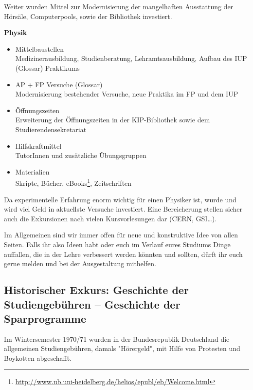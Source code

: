 Weiter wurden Mittel zur Modernisierung der mangelhaften Ausstattung der Hörsäle,
Computerpools, sowie der Bibliothek investiert.

\vspace{5mm}
\textbf{Physik}
\begin{itemize}
\item {Mittelbaustellen}\\Medizinerausbildung, Studienberatung, Lehramtsausbildung, Aufbau des IUP (Glossar) Praktikums
\item {AP + FP Versuche (Glossar)}\\Modernisierung bestehender Versuche, neue
Praktika im FP und dem IUP
\item {Öffnungszeiten}\\Erweiterung der Öffnungszeiten in der \gls{KIP}-Bibliothek sowie dem Studierendensekretariat
\item {Hilfskraftmittel}\\ TutorInnen und zusätzliche Übungsgruppen
\item {Materialien}\\Skripte, Bücher, eBooks\footnote{\url{http://www.ub.uni-heidelberg.de/helios/epubl/eb/Welcome.html}}, Zeitschriften
\end{itemize}

Da experimentelle Erfahrung enorm wichtig für einen Physiker ist, wurde und
wird viel Geld in aktuellste Versuche investiert. Eine Bereicherung stellen
sicher auch die Exkursionen nach vielen Kursvorlesungen dar (CERN, GSI\dots).

Im Allgemeinen sind wir immer offen für neue und konstruktive Idee von allen
Seiten. Falls ihr also Ideen habt oder euch im Verlauf eures Studiums Dinge
auffallen, die in der Lehre verbessert werden könnten und sollten, dürft ihr
euch gerne melden und bei der Ausgestaltung mithelfen.


\iffalse
\subsection*{Historischer Exkurs: Geschichte der Studiengebühren -- Geschichte der Sparprogramme}

Im Wintersemester 1970/71 wurden in der Bundesrepublik Deutschland die
allgemeinen Studiengebühren, damals "Hörergeld", mit Hilfe von Protesten und
Boykotten abgeschafft.

